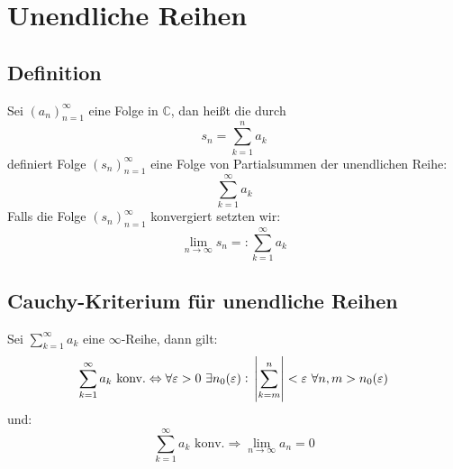 \documentclass[10pt]{article}
\newcommand{\C}{\mathbb{C}}
\newcommand{\an}{{(a_n)}_{n=1}^\infty}
\newcommand{\sn}{{(s_n)}_{n=1}^\infty}
\begin{document}
    \section{Unendliche Reihen}
    \subsection{Definition}
    Sei $\an$ eine Folge in $\C$, dan  heißt die durch
    \begin{equation*}
        s_n = \sum_{k=1}^n a_k
    \end{equation*}
    definiert Folge $\sn$ eine Folge von Partialsummen der
    unendlichen Reihe:
    \begin{equation*}
        \sum_{k=1}^\infty a_k
    \end{equation*}
    Falls die Folge $\sn$ konvergiert setzten wir:
    \begin{equation*}
        \lim_{n \rightarrow \infty} s_n =: \sum_{k=1}^\infty a_k
    \end{equation*}

    \subsection{Cauchy-Kriterium für unendliche Reihen}
    Sei $\sum_{k=1}^\infty a_k$ eine $\infty$-Reihe, dann gilt:
    \begin{equation*}
        \sum_{k=1}^\infty a_k \text{ konv.} \Leftrightarrow
        \forall \varepsilon > 0\ \exists n_0(\varepsilon):\
        \abs{\sum_{k=m}^n} < \varepsilon\
        \forall n, m>n_0(\varepsilon)
    \end{equation*}
    und:
    \begin{equation*}
        \sum_{k=1}^\infty a_k \text{ konv.} \Rightarrow
        \lim_{n \rightarrow \infty} a_n = 0
    \end{equation*}
\end{document}
